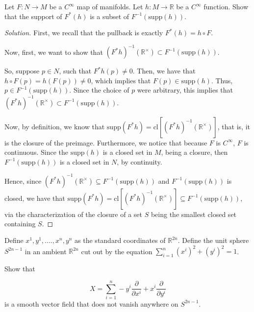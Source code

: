 \documentclass[10pt]{article}
\newenvironment{problem}[2][]{\begin{trivlist}
\item[\hskip \labelsep {\bfseries #1}\hskip \labelsep {\bfseries #2.}]}{\end{trivlist}}
\begin{document}
\begin{problem}{Question 2}

Let $F:N \to M$ be a $C^\infty$ map of manifolds. Let $h: M \to \mathbb{R}$ be a $C^\infty$ function. Show that the support of $F^*(h)$ is a subset of $F^{-1}(\text{supp}(h))$.

\end{problem}

\begin{proof}[Solution]

First, we recall that the pullback is exactly $F^*(h) = h \circ F$.

Now, first, we want to show that $(F^*h)^{-1}(\mathbb{R}^\times) \subset F^{-1}(\text{supp}(h))$.

So, suppose $p \in N$, such that $F^*h(p) \not = 0$. Then, we have that $h \circ F(p) = h(F(p)) \not = 0$, which implies that $F(p) \in \text{supp}(h)$. Thus, $p \in F^{-1}(\text{supp}(h))$. Since the choice of $p$ were arbitrary, this implies that $(F^*h)^{-1}(\mathbb{R}^\times) \subset F^{-1}(\text{supp}(h))$.

Now, by definition, we know that $\text{supp}(F^*h) = \text{cl}[(F^*h)^{-1}(\mathbb{R}^\times)]$, that is, it is the closure of the preimage. Furthermore, we notice that because $F$ is $C^\infty$, $F$ is continuous. Since the $\text{supp}(h)$ is a closed set in $M$, being a closure, then $F^{-1}(\text{supp}(h))$ is a closed set in $N$, by continuity.

Hence, since $(F^*h)^{-1}(\mathbb{R}^\times) \subseteq F^{-1}(\text{supp}(h))$ and $F^{-1}(\text{supp}(h))$ is closed, we have that $\text{supp}(F^*h) = \text{cl}[(F^*h)^{-1}(\mathbb{R}^\times)] \subseteq F^{-1}(\text{supp}(h))$, via the characterization of the closure of a set $S$ being the smallest closed set containing $S$.

\end{proof}

\begin{problem}{Question 3}

Define $x^1, y^1,....,x^n, y^n$ as the standard coordinates of $\mathbb{R}^{2n}$. Define the unit sphere $S^{2n-1}$ in an ambient $\mathbb{R}^{2n}$ cut out by the equation $\sum_{i=1}^n (x^i)^2 + (y^i)^2 = 1$.

Show that 

$$ X= \sum_{i=1}^n -y^i \frac{\partial}{\partial x^i} + x^i \frac{\partial}{\partial y^i} $$ is a smooth vector field that does not vanish anywhere on $S^{2n-1}$.

\end{problem}
\end{document}
